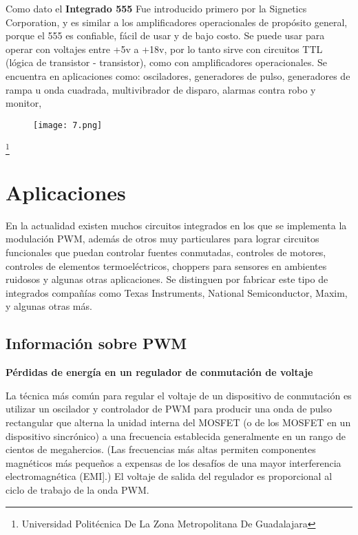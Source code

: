 \documentclass[11pt,a4paper]{article}
\begin{document}
Como dato el \textbf{Integrado 555} Fue introducido primero por la Signetics Corporation, y  es similar a los amplificadores operacionales de propósito general, porque el 555 es confiable, fácil de usar y de bajo costo.
Se puede usar para operar con voltajes entre +5v a +18v, por lo tanto sirve con circuitos TTL (lógica de transistor - transistor), como con amplificadores operacionales. Se encuentra en aplicaciones como: osciladores, generadores de pulso, generadores de rampa u onda cuadrada, multivibrador de disparo, alarmas contra robo y monitor,

\begin{figure}[hbtp]
\centering
\texttt{[image: 7.png]}
\end{figure} 

\footnote{Universidad Politécnica De La Zona Metropolitana De Guadalajara} 

\newpage



\section{Aplicaciones}

En la actualidad existen muchos circuitos integrados en los que se implementa la modulación PWM, además de otros muy particulares para lograr circuitos funcionales que puedan controlar fuentes conmutadas, controles de motores, controles de elementos termoeléctricos, choppers para sensores en ambientes ruidosos y algunas otras aplicaciones. Se distinguen por fabricar este tipo de integrados compañías como Texas Instruments, National Semiconductor, Maxim, y algunas otras más. 

\subsection{Información sobre PWM}
\textbf{Pérdidas de energía en un regulador de conmutación de voltaje}

La técnica más común para regular el voltaje de un dispositivo de conmutación es utilizar un oscilador y controlador de PWM para producir una onda de pulso rectangular que alterna la unidad interna del MOSFET (o de los MOSFET en un dispositivo sincrónico) a una frecuencia establecida generalmente en un rango de cientos de megahercios. (Las frecuencias más altas permiten componentes magnéticos más pequeños a expensas de los desafíos de una mayor interferencia electromagnética (EMI].) El voltaje de salida del regulador es proporcional al ciclo de trabajo de la onda PWM.
\end{document}
